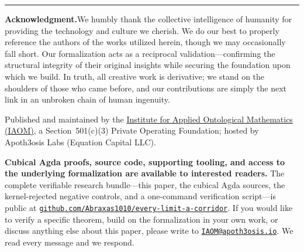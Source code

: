 \documentclass[11pt,letterpaper]{article}
\theoremstyle{plain}
\theoremstyle{definition}
\theoremstyle{remark}
\begin{document}



\bigskip
\noindent\rule{\linewidth}{0.4pt}
\bigskip

\noindent\small
\textbf{Acknowledgment.}\quad We humbly thank the collective intelligence of
humanity for providing the technology and culture we cherish. We do our best to
properly reference the authors of the works utilized herein, though we may
occasionally fall short. Our formalization acts as a reciprocal
validation---confirming the structural integrity of their original insights while
securing the foundation upon which we build. In truth, all creative work is
derivative; we stand on the shoulders of those who came before, and our
contributions are simply the next link in an unbroken chain of human ingenuity.
\normalsize

\smallskip

\noindent\small
Published and maintained by the
\href{https://www.apoth3osis.io/IAOM}{Institute for Applied Ontological
Mathematics (IAOM)}, a Section~501(c)(3) Private Operating Foundation; hosted by
Apoth3osis Labs (Equation Capital LLC).

\smallskip

\noindent
\textbf{Cubical Agda proofs, source code, supporting tooling, and access to the
underlying formalization are available to interested readers.} The complete verifiable
research bundle---this paper, the cubical Agda sources, the kernel-rejected negative
controls, and a one-command verification script---is public at
\href{https://github.com/Abraxas1010/every-limit-a-corridor}{\nolinkurl{github.com/Abraxas1010/every-limit-a-corridor}}.
If you would like to verify a specific theorem, build on the formalization in
your own work, or discuss anything else about this paper, please write to
\href{mailto:IAOM@apoth3osis.io}{\nolinkurl{IAOM@apoth3osis.io}}. We read every
message and we respond.
\normalsize
\end{document}
